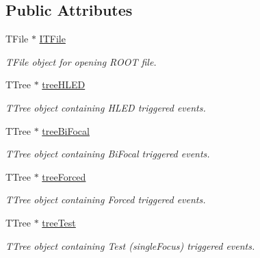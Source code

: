 \subsection*{Public Attributes}
\begin{DoxyCompactItemize}
\item 
\mbox{\label{classIFile_a14a6bdfbeb5d99eb8fdde9ad21ad7566}} 
T\+File $\ast$ \hyperlink{classIFile_a14a6bdfbeb5d99eb8fdde9ad21ad7566}{I\+T\+File}
\begin{DoxyCompactList}\small\item\em T\+File object for opening R\+O\+OT file. \end{DoxyCompactList}\item 
\mbox{\label{classIFile_ab0da04ee48eebbe973f0cc0b897062c4}} 
T\+Tree $\ast$ \hyperlink{classIFile_ab0da04ee48eebbe973f0cc0b897062c4}{tree\+H\+L\+ED}
\begin{DoxyCompactList}\small\item\em T\+Tree object containing H\+L\+ED triggered events. \end{DoxyCompactList}\item 
\mbox{\label{classIFile_affa51dff120036964e5a408b0805a014}} 
T\+Tree $\ast$ \hyperlink{classIFile_affa51dff120036964e5a408b0805a014}{tree\+Bi\+Focal}
\begin{DoxyCompactList}\small\item\em T\+Tree object containing Bi\+Focal triggered events. \end{DoxyCompactList}\item 
\mbox{\label{classIFile_a3dbab19469b1c7b4b1edb70bc19fcf19}} 
T\+Tree $\ast$ \hyperlink{classIFile_a3dbab19469b1c7b4b1edb70bc19fcf19}{tree\+Forced}
\begin{DoxyCompactList}\small\item\em T\+Tree object containing Forced triggered events. \end{DoxyCompactList}\item 
\mbox{\label{classIFile_a53549985d2ab3ee76f3d0100edf2aa95}} 
T\+Tree $\ast$ \hyperlink{classIFile_a53549985d2ab3ee76f3d0100edf2aa95}{tree\+Test}
\begin{DoxyCompactList}\small\item\em T\+Tree object containing Test (single\+Focus) triggered events. \end{DoxyCompactList}\end{DoxyCompactItemize}
